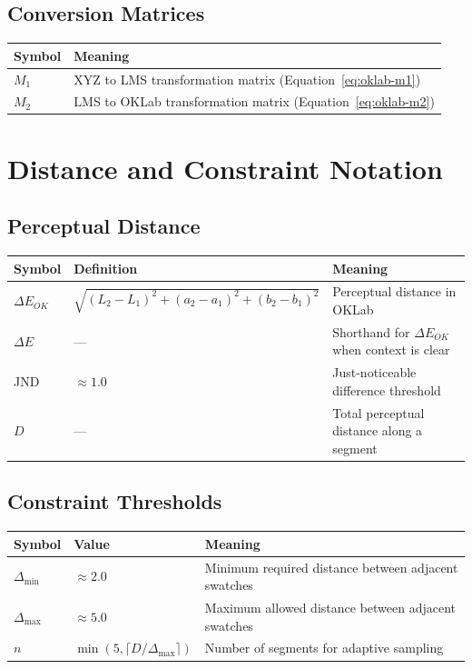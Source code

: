 \subsection{Conversion Matrices}

\begin{center}
\begin{tabular}{ll}
  \toprule
  \textbf{Symbol} & \textbf{Meaning} \\
  \midrule
  $M_1$ & XYZ to LMS transformation matrix (Equation~\ref{eq:oklab-m1}) \\
  $M_2$ & LMS to OKLab transformation matrix (Equation~\ref{eq:oklab-m2}) \\
  \bottomrule
\end{tabular}
\end{center}

\section{Distance and Constraint Notation}
\label{sec:notation-distance}

\subsection{Perceptual Distance}

\begin{center}
\begin{tabular}{lll}
  \toprule
  \textbf{Symbol} & \textbf{Definition} & \textbf{Meaning} \\
  \midrule
  $\Delta E_{OK}$ & $\sqrt{(L_2-L_1)^2 + (a_2-a_1)^2 + (b_2-b_1)^2}$ & Perceptual distance in OKLab \\
  $\Delta E$ & --- & Shorthand for $\Delta E_{OK}$ when context is clear \\
  JND & $\approx 1.0$ & Just-noticeable difference threshold \\
  $D$ & --- & Total perceptual distance along a segment \\
  \bottomrule
\end{tabular}
\end{center}

\subsection{Constraint Thresholds}

\begin{center}
\begin{tabular}{lll}
  \toprule
  \textbf{Symbol} & \textbf{Value} & \textbf{Meaning} \\
  \midrule
  $\Delta_{\min}$ & $\approx 2.0$ & Minimum required distance between adjacent swatches \\
  $\Delta_{\max}$ & $\approx 5.0$ & Maximum allowed distance between adjacent swatches \\
  $n$ & $\min(5, \lceil D/\Delta_{\max} \rceil)$ & Number of segments for adaptive sampling \\
  \bottomrule
\end{tabular}
\end{center}

